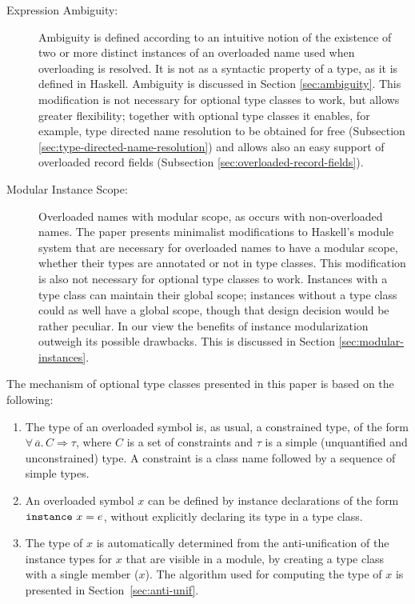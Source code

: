 \begin{description}

\item[Expression Ambiguity:] Ambiguity is defined according to an
  intuitive notion of the existence of two or more distinct instances
  of an overloaded name used when overloading is resolved. It is not
  as a syntactic property of a type, as it is defined in Haskell.
  Ambiguity is discussed in Section \ref{sec:ambiguity}. This
  modification is not necessary for optional type classes to work, but
  allows greater flexibility; together with optional type classes it
  enables, for example, type directed name resolution to be obtained
  for free (Subsection \ref{sec:type-directed-name-resolution}) and
  allows also an easy support of overloaded record fields (Subsection
  \ref{sec:overloaded-record-fields}).


\item[Modular Instance Scope:] Overloaded names with modular scope, as
  occurs with non-overloaded names. The paper presents minimalist
  modifications to Haskell's module system that are necessary for
  overloaded names to have a modular scope, whether their types are
  annotated or not in type classes. This modification is also not
  necessary for optional type classes to work. Instances with a type
  class can maintain their global scope; instances without a type
  class could as well have a global scope, though that design decision
  would be rather peculiar. In our view the benefits of instance
  modularization outweigh its possible drawbacks. This is discussed in
  Section \ref{sec:modular-instances}.

\end{description}

The mechanism of optional type classes presented in this paper is
based on the following:

\begin{enumerate}

 \item The type of an overloaded symbol is, as usual, a constrained
   type, of the form $\forall\,\overline{a}.\,C \Rightarrow \tau$,
   where $C$ is a set of constraints and $\tau$ is a simple
   (unquantified and unconstrained) type. A constraint is a class name
   followed by a sequence of simple types.

\item An overloaded symbol $x$ can be defined by instance declarations
  of the form ${\tt instance}\ x=e$, without explicitly declaring its type
  in a type class.
  
\item The type of $x$ is automatically determined from the
  anti-unification of the instance types for $x$ that are visible in a
  module, by creating a type class with a single member ($x$). The
  algorithm used for computing the type of $x$ is presented in
  Section~\ref{sec:anti-unif}.

\end{enumerate}

